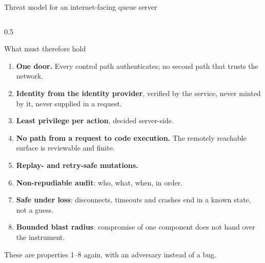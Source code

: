 \begin{frame}{Threat model for an internet-facing queue server}
\begin{columns}[T]
\begin{column}{0.5\textwidth}
\begin{block}{What must therefore hold}
                \begin{enumerate}
                    \item \textbf{One door.} Every control path authenticates; no second path that trusts the network.
                    \item \textbf{Identity from the identity provider}, verified by the service, never minted by it,
                          never supplied in a request.
                    \item \textbf{Least privilege per action}, decided server-side.
                    \item \textbf{No path from a request to code execution.} The remotely reachable surface is
                          reviewable and finite.
                    \item \textbf{Replay- and retry-safe mutations.}
                    \item \textbf{Non-repudiable audit}: who, what, when, in order.
                    \item \textbf{Safe under loss}: disconnects, timeouts and crashes end in a known state, not a guess.
                    \item \textbf{Bounded blast radius}: compromise of one component does not hand over the instrument.
                \end{enumerate}
            \end{block}
            {\footnotesize\color{qsgray} These are properties 1--8 again, with an adversary instead of a bug.\par}
        \end{column}
    \end{columns}
\end{frame}

